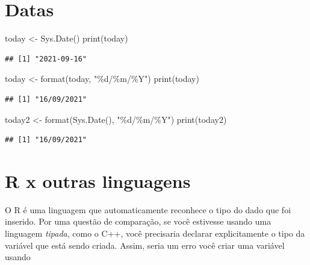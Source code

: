 \documentclass[
]{book}
\newenvironment{Shaded}{\begin{snugshade}}{\end{snugshade}}
\newcommand{\FunctionTok}[1]{\textcolor[rgb]{0.00,0.00,0.00}{#1}}
\newcommand{\NormalTok}[1]{#1}
\newcommand{\OtherTok}[1]{\textcolor[rgb]{0.56,0.35,0.01}{#1}}
\newcommand{\StringTok}[1]{\textcolor[rgb]{0.31,0.60,0.02}{#1}}
\begin{document}
\hypertarget{datas}{%
\section{Datas}\label{datas}}

\begin{Shaded}
\begin{Highlighting}[]
\NormalTok{today }\OtherTok{\textless{}{-}} \FunctionTok{Sys.Date}\NormalTok{()}
\FunctionTok{print}\NormalTok{(today)}
\end{Highlighting}
\end{Shaded}

\begin{verbatim}
## [1] "2021-09-16"
\end{verbatim}

\begin{Shaded}
\begin{Highlighting}[]
\NormalTok{today }\OtherTok{\textless{}{-}} \FunctionTok{format}\NormalTok{(today, }\StringTok{"\%d/\%m/\%Y"}\NormalTok{)}
\FunctionTok{print}\NormalTok{(today)}
\end{Highlighting}
\end{Shaded}

\begin{verbatim}
## [1] "16/09/2021"
\end{verbatim}

\begin{Shaded}
\begin{Highlighting}[]
\NormalTok{today2 }\OtherTok{\textless{}{-}} \FunctionTok{format}\NormalTok{(}\FunctionTok{Sys.Date}\NormalTok{(), }\StringTok{"\%d/\%m/\%Y"}\NormalTok{)}
\FunctionTok{print}\NormalTok{(today2)}
\end{Highlighting}
\end{Shaded}

\begin{verbatim}
## [1] "16/09/2021"
\end{verbatim}

\hypertarget{r-x-outras-linguagens}{%
\section{R x outras linguagens}\label{r-x-outras-linguagens}}

O R é uma linguagem que automaticamente reconhece o tipo do dado que foi inserido. Por uma questão de comparação, se você estivesse usando uma linguagem \emph{tipada}, como o C++, você precisaria declarar explicitamente o tipo da variável que está sendo criada. Assim, seria um erro você criar uma variável usando
\end{document}
